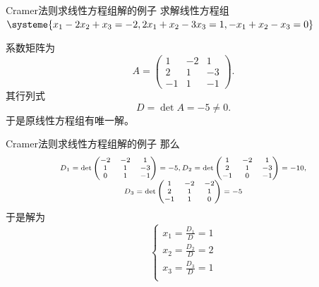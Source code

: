 \begin{frame}

\begin{block}{Cramer法则求线性方程组解的例子}
求解线性方程组
$\systeme{x_1 - 2x_2 + x_3 = -2 , 2x_1 + x_2 - 3x_3 = 1 , -x_1 + x_2 - x_3 = 0}$

\vspace{1em}
\pause

系数矩阵为
$$A = \begin{pmatrix} 1 & -2 & 1 \\ 2 & 1 & -3 \\ -1 & 1 & -1 \end{pmatrix}.$$
其行列式
$$D = \det A = -5 \neq 0.$$
于是原线性方程组有唯一解。
\end{block}

\end{frame}


\begin{frame}

\begin{block}{Cramer法则求线性方程组解的例子}
那么
\[
\scriptsize
\begin{array}{c}
D_1 = \det\begin{pmatrix} -2 & -2 & 1 \\ 1 & 1 & -3 \\ 0 & 1 & -1 \end{pmatrix} = -5, D_2 = \det \begin{pmatrix} 1 & -2 & 1 \\ 2 & 1 & -3 \\ -1 & 0 & -1 \end{pmatrix} = -10, \\
D_3 = \det \begin{pmatrix} 1 & -2 & -2 \\ 2 & 1 & 1 \\ -1 & 1 & 0 \end{pmatrix} = -5
\end{array}
\]
于是解为
\[
\begin{cases}
x_1 = \frac{D_1}{D} = 1 \\
x_2 = \frac{D_2}{D} = 2 \\
x_3 = \frac{D_3}{D} = 1 \\
\end{cases}
\]
\end{block}

\end{frame}

